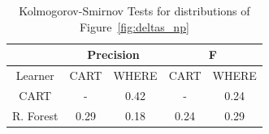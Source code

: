\documentclass{sig-alternative}
\newcommand{\fig}[1]{Figure~\ref{fig:#1}}
\begin{document}
\begin{table}[!t]
\renewcommand{\baselinestretch}{0.8}
\scriptsize
\centering
  \begin{tabular}{c|c c|cc}
    &   \multicolumn{2}{c|}{Precision} & \multicolumn{2}{c}{F} \\ \hline 
    Learner & CART  & WHERE & CART & WHERE \\
\hline
    CART & - & 0.42 & - & 0.24 \\
    R. Forest &  0.29 & 0.18 & 0.24 & 0.29 \\
  \end{tabular}
    \caption{Kolmogorov-Smirnov Tests for distributions of  \fig{deltas_np}}\label{tab:ks}
\end{table}



  
\end{document}
